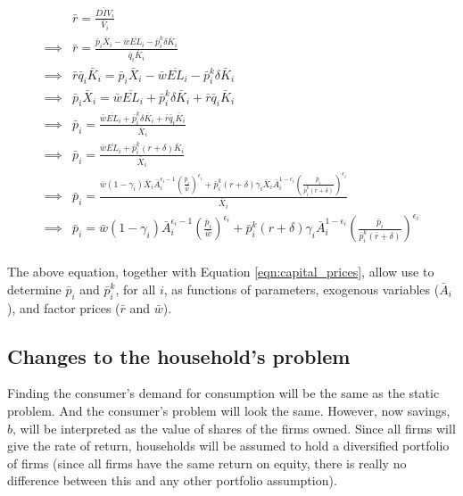 \documentclass[letterpaper,12pt]{article}
\theoremstyle{definition}
\begin{document}
\begin{spacing}{1.5}
\begin{equation}
\label{eqn:price_det_ss}
\begin{split}
&\bar{r} = \frac{\overline{DIV}_{i}}{\bar{V}_{i}} \\
\implies & \bar{r} = \frac{ \bar{p}_{i}\bar{X}_{i}-\bar{w}\overline{EL}_{i}-\bar{p}^{k}_{i}\delta \bar{K}_{i}}{\bar{q}_{i}\bar{K}_{i}} \\
\implies & \bar{r}\bar{q}_{i}\bar{K}_{i} = \bar{p}_{i}\bar{X}_{i}-\bar{w}\overline{EL}_{i}-\bar{p}^{k}_{i}\delta \bar{K}_{i} \\
\implies &  \bar{p}_{i}\bar{X}_{i} = \bar{w}\overline{EL}_{i} + \bar{p}^{k}_{i}\delta \bar{K}_{i} +  \bar{r}\bar{q}_{i}\bar{K}_{i} \\
\implies &   \bar{p}_{i} = \frac{\bar{w}\overline{EL}_{i} + \bar{p}^{k}_{i}\delta \bar{K}_{i} +  \bar{r}\bar{q}_{i}\bar{K}_{i}}{\bar{X}_{i}}\\
\implies &   \bar{p}_{i} = \frac{\bar{w}\overline{EL}_{i} + \bar{p}^{k}_{i}(r+\delta) \bar{K}_{i}}{\bar{X}_{i}}\\
\implies &\bar{p}_{i} = \frac{ \bar{w}(1-\gamma_{i})\bar{X}_{i}\bar{A}_{i}^{\epsilon_{i}-1}\left( \frac{ \bar{p}_{i}}{\bar{w}}\right)^{\epsilon_{i}}+\bar{p}^{k}_{i}(r+\delta)\gamma_{i}\bar{X}_{i}\bar{A}_{i}^{1-\epsilon_{i}} \left(\frac{\bar{p}_{i}}{\bar{p}^{k}_{i}(\bar{r}+\delta)} \right)^{\epsilon_{i}}}{\bar{X}_{i}} \\
\implies &\bar{p}_{i} = \bar{w}(1-\gamma_{i})\bar{A}_{i}^{\epsilon_{i}-1}\left( \frac{ \bar{p}_{i}}{\bar{w}}\right)^{\epsilon_{i}}+\bar{p}^{k}_{i}(r+\delta)\gamma_{i}\bar{A}_{i}^{1-\epsilon_{i}} \left(\frac{\bar{p}_{i}}{\bar{p}^{k}_{i}(\bar{r}+\delta)} \right)^{\epsilon_{i}}\\
\end{split}
\end{equation}

The above equation, together with Equation \ref{eqn:capital_prices}, allow use to determine $\bar{p}_{i}$ and $\bar{p}^{k}_{i}$, for all $i$, as functions of parameters, exogenous variables ($\bar{A}_{i}$), and factor prices ($\bar{r}$ and $\bar{w}$).


\subsection*{Changes to the household's problem}

Finding the consumer's demand for consumption will be the same as the static problem.  And the consumer's problem will look the same.  However, now savings, $b$, will be interpreted as the value of shares of the firms owned.  Since all firms will give the rate of return, households will be assumed to hold a diversified portfolio of firms (since all firms have the same return on equity, there is really no difference between this and any other portfolio assumption).  


\end{spacing}
\end{document}
